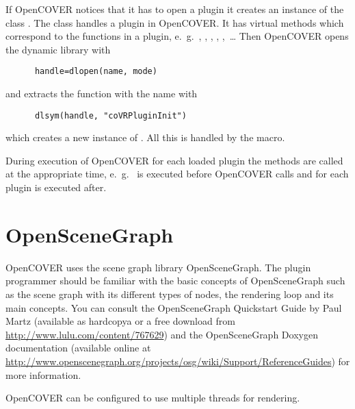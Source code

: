 If OpenCOVER notices that it has to open a plugin it creates an instance of the 
class . The class  handles a plugin in OpenCOVER. It
has virtual methods which correspond to the functions in a plugin, e.~g.\ , 
, , , ,~\ldots
Then OpenCOVER opens the dynamic library with 

\begin{verbatim}
      handle=dlopen(name, mode)
\end{verbatim}

and extracts the function with the name  with 

\begin{verbatim}
      dlsym(handle, "coVRPluginInit") 
\end{verbatim}

which creates a new instance of .
All this is handled by the  macro.

During execution of OpenCOVER for each loaded plugin the methods are called at the 
appropriate time, e.~g.\  is executed before OpenCOVER 
calls  and for each plugin 
is executed after.


\section{OpenSceneGraph}
\latexonly
{}
\endlatexonly

OpenCOVER uses the scene graph library OpenSceneGraph. The plugin programmer should be 
familiar with the basic concepts of OpenSceneGraph such as the scene graph with its different
types of nodes, the rendering loop and its main concepts. 
You can consult the OpenSceneGraph Quickstart Guide by Paul Martz
(available as hardcopya or a free download from \url{http://www.lulu.com/content/767629})
and the OpenSceneGraph Doxygen documentation (available online at
\url{http://www.openscenegraph.org/projects/osg/wiki/Support/ReferenceGuides})
for more information.

OpenCOVER can be configured to use multiple threads for rendering.

